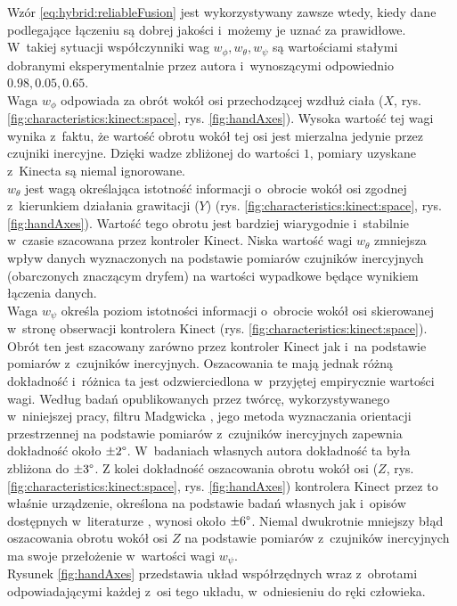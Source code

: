 Wzór \eqref{eq:hybrid:reliableFusion} jest wykorzystywany zawsze wtedy, kiedy dane podlegające łączeniu są dobrej jakości i~możemy je uznać za prawidłowe. W~takiej sytuacji współczynniki wag $w_\phi , w_\theta , w_\psi$ są wartościami stałymi dobranymi eksperymentalnie przez autora i~wynoszącymi odpowiednio $0.98,0.05,0.65$.\\
Waga $w_\phi$ odpowiada za obrót wokół osi przechodzącej wzdłuż ciała ($X$, rys. \ref{fig:characteristics:kinect:space}, rys. \ref{fig:handAxes}).
Wysoka wartość tej wagi wynika z~faktu, że wartość obrotu wokół tej osi jest mierzalna jedynie przez czujniki inercyjne. Dzięki wadze zbliżonej do wartości $1$, pomiary uzyskane z~Kinecta są niemal ignorowane.\\
$w_\theta$ jest wagą określająca istotność informacji o~obrocie wokół osi zgodnej z~kierunkiem działania grawitacji ($Y$) (rys. \ref{fig:characteristics:kinect:space}, rys. \ref{fig:handAxes}). Wartość tego obrotu jest bardziej wiarygodnie i~stabilnie w~czasie szacowana przez kontroler Kinect. Niska wartość wagi $w_\theta$ zmniejsza wpływ danych wyznaczonych na podstawie pomiarów czujników inercyjnych (obarczonych znaczącym dryfem) na wartości wypadkowe będące wynikiem łączenia danych.\\ 
Waga $w_\psi$ określa poziom istotności informacji o~obrocie wokół osi skierowanej w~stronę obserwacji kontrolera Kinect (rys. \ref{fig:characteristics:kinect:space}). Obrót ten jest szacowany zarówno przez kontroler Kinect jak i~na podstawie pomiarów z~czujników inercyjnych. Oszacowania te mają jednak różną dokładność i~różnica ta jest odzwierciedlona w~przyjętej empirycznie wartości wagi. Według badań opublikowanych przez twórcę, wykorzystywanego w~niniejszej pracy, filtru Madgwicka \cite{Madgwick2010}, jego metoda wyznaczania orientacji przestrzennej na podstawie pomiarów z~czujników inercyjnych zapewnia dokładność około $\pm2\degree$. W~badaniach własnych autora dokładność ta była zbliżona do $\pm3\degree$. Z kolei dokładność oszacowania obrotu wokół osi ($Z$,  rys. \ref{fig:characteristics:kinect:space}, rys. \ref{fig:handAxes}) 
kontrolera Kinect przez to właśnie urządzenie, określona na podstawie badań własnych jak i~opisów dostępnych w~literaturze \cite{Huber2015}, wynosi około $\pm6\degree$. Niemal dwukrotnie mniejszy błąd 
oszacowania obrotu wokół osi $Z$ 
na podstawie pomiarów z~czujników inercyjnych ma swoje przełożenie w~wartości wagi $w_\psi$.\\
Rysunek \ref{fig:handAxes} przedstawia układ współrzędnych wraz z~obrotami odpowiadającymi każdej z~osi tego układu, w~odniesieniu do ręki człowieka.


